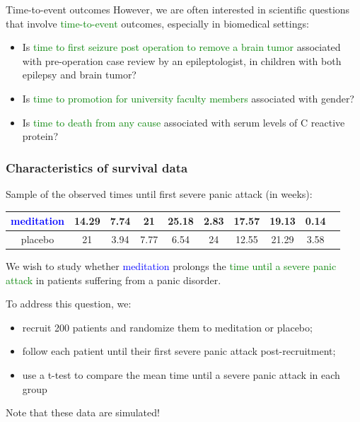 \documentclass[10pt,t]{beamer}
\begin{document}
\begin{frame}{Time-to-event outcomes}
However, we are often interested in scientific questions that involve \textcolor{green}{time-to-event} outcomes, especially in biomedical settings:
\begin{itemize}
\item Is \textcolor{green}{time to first seizure post operation to remove a brain tumor} associated with pre-operation case review by an epileptologist, in children with both epilepsy and brain tumor?
\item Is \textcolor{green}{time to promotion for university faculty members} associated with gender?
\item Is \textcolor{green}{time to death from any cause} associated with serum levels of C reactive protein?
\end{itemize}
\end{frame}

\begin{frame}
\frametitle{Characteristics of survival data}
{\fontsize{7.5pt}{7.2}\selectfont
Sample of the observed times until first severe panic attack (in weeks):
\begin{tabular}{|c|c|c|c|c|c|c|c|c|c|}
\hline
\textcolor{blue}{meditation} & 14.29 & 7.74 & 21 & 25.18 & 2.83 & 17.57 & 19.13 & 0.14  \\
\hline
placebo & 21 & 3.94 & 7.77 & 6.54 & 24 & 12.55 & 21.29 & 3.58 \\
\hline
\end{tabular}
}

\vspace{0.5cm}
We wish to study whether \textcolor{blue}{meditation} prolongs the \textcolor{green}{time until a severe panic attack} in patients suffering from a panic disorder.

To address this question, we: 
\begin{itemize}
\item recruit 200 patients and randomize them to meditation or placebo;
\item follow each patient until their first severe panic attack post-recruitment;
\item use a t-test to compare the mean time until a severe panic attack in each group
\end{itemize}
\vfill
\begin{footnotesize}
	Note that these data are simulated!
\end{footnotesize}
\end{frame}
\end{document}
